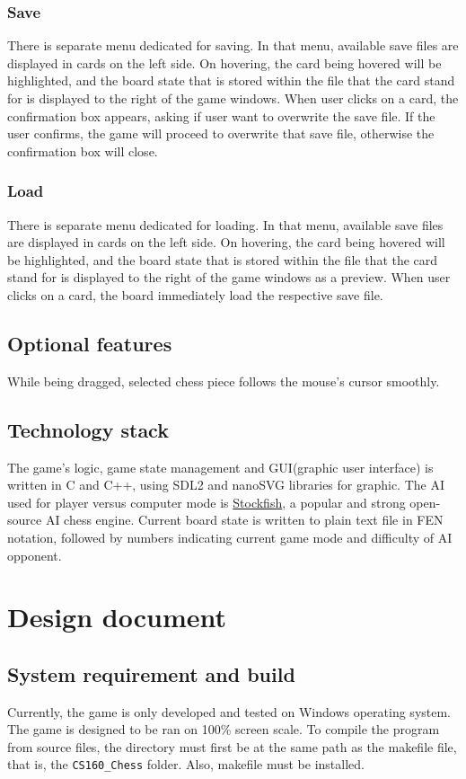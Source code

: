 \documentclass[a4paper, 10pt, titlepage]{report}
\begin{document}
\subsection{Save}
There is separate menu dedicated for saving. In that menu, available save files are displayed in cards on the left side. On hovering, the card being hovered will be highlighted, and the board state that is stored within the file that the card stand for is displayed to the right of the game windows. When user clicks on a card, the confirmation box appears, asking if user want to overwrite the save file. If the user confirms, the game will proceed to overwrite that save file, otherwise the confirmation box will close.
\subsection{Load}
There is separate menu dedicated for loading. In that menu, available save files are displayed in cards on the left side. On hovering, the card being hovered will be highlighted, and the board state that is stored within the file that the card stand for is displayed to the right of the game windows as a preview. When user clicks on a card, the board immediately load the respective save file.
\section{Optional features}
While being dragged, selected chess piece follows the mouse's cursor smoothly.
\section{Technology stack}
The game's logic, game state management and GUI(graphic user interface) is written in C and C++, using SDL2 and nanoSVG libraries for graphic. The AI used for player versus computer mode is \href{https://github.com/official-stockfish/Stockfish}{Stockfish}, a popular and strong open-source AI chess engine. Current board state is written to plain text file in FEN notation, followed by numbers indicating current game mode and difficulty of AI opponent.
\chapter{Design document}
\section{System requirement and build}
Currently, the game is only developed and tested on Windows operating system. The game is designed to be ran on 100\% screen scale.
To compile the program from source files, the directory must first be at the same path as the makefile file, that is, the \texttt{CS160\_Chess} folder. Also, makefile must be installed.
\end{document}
